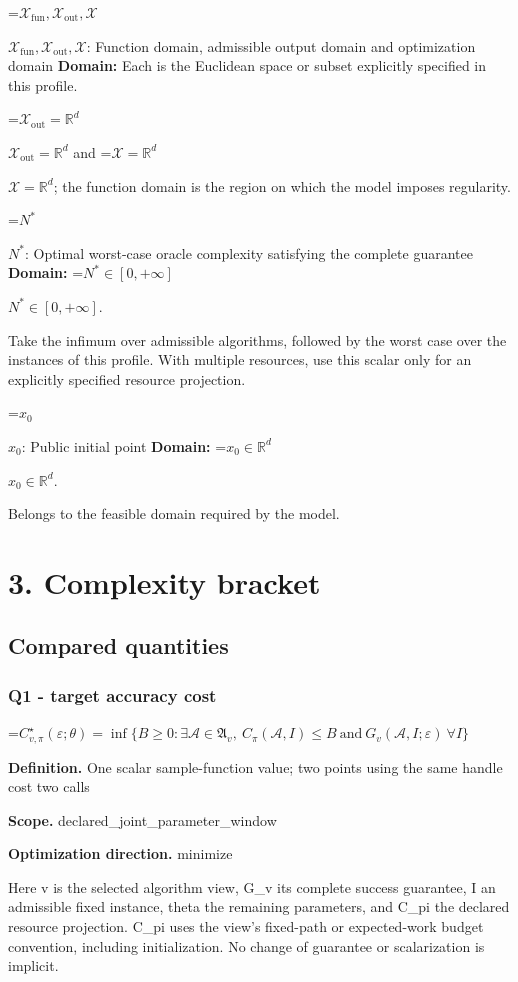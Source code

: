 \documentclass[10pt,a4paper]{article}
\newcommand{\AtlasMath}[1]{\par\begingroup\centering\setbox0=\hbox{$\displaystyle #1$}\ifdim\wd0>1.4\linewidth\typeout{ATLAS WIDE FORMULA: \the\wd0}\fi\ifdim\wd0>\linewidth\resizebox{\linewidth}{!}{\box0}\else\box0\fi\par\endgroup}
\newcommand{\AtlasInlineMath}[1]{\begingroup\setbox0=\hbox{$#1$}\ifdim\wd0>.4\linewidth\endgroup\AtlasMath{#1}\else\endgroup$#1$\fi}
\begin{document}
\AtlasInlineMath{\mathcal{X}_{\mathrm{fun}},\mathcal{X}_{\mathrm{out}},\mathcal{X}}: Function domain, admissible output domain and optimization domain \textbf{Domain:} Each is the Euclidean space or subset explicitly specified in this profile.

\AtlasInlineMath{\mathcal{X}_{\mathrm{out}}=\mathbb{R}^d} and \AtlasInlineMath{\mathcal{X}=\mathbb{R}^d}; the function domain is the region on which the model imposes regularity.

\AtlasInlineMath{N^*}: Optimal worst-case oracle complexity satisfying the complete guarantee \textbf{Domain:} \AtlasInlineMath{N^*\in[0,+\infty]}.

Take the infimum over admissible algorithms, followed by the worst case over the instances of this profile. With multiple resources, use this scalar only for an explicitly specified resource projection.

\AtlasInlineMath{x_0}: Public initial point \textbf{Domain:} \AtlasInlineMath{x_0\in\mathbb{R}^d}.

Belongs to the feasible domain required by the model.

\section{3. Complexity bracket}
\subsection{Compared quantities}
\subsubsection{Q1 - target accuracy cost}
\AtlasMath{C^\star_{v,\pi}(\varepsilon;\theta)=\inf\{B\ge0:\exists\mathcal A\in\mathfrak A_v,\ C_\pi(\mathcal A,I)\le B\ \text{and}\ G_v(\mathcal A,I;\varepsilon)\ \forall I\}}
\textbf{Definition.} One scalar sample-function value; two points using the same handle cost two calls

\textbf{Scope.} declared\_joint\_parameter\_window

\textbf{Optimization direction.} minimize

Here v is the selected algorithm view, G\_v its complete success guarantee, I an admissible fixed instance, theta the remaining parameters, and C\_pi the declared resource projection. C\_pi uses the view's fixed-path or expected-work budget convention, including initialization. No change of guarantee or scalarization is implicit.
\end{document}
